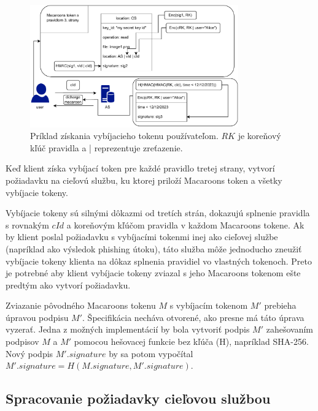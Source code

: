 \begin{figure}
    \centerline{\includegraphics[width=0.8\textwidth]{images/user_request}}
    \caption[Získanie vybíjacieho tokenu používateľom]{Príklad získania vybíjacieho tokenu používateľom. $RK$ je koreňový kľúč pravidla a | reprezentuje zreťazenie.}
    \label{fig:user_request}
\end{figure}

Keď klient získa vybíjací token pre každé pravidlo tretej strany, vytvorí požiadavku na cieľovú službu, ku ktorej priloží Macaroons token a všetky vybíjacie tokeny.

Vybíjacie tokeny sú silnými dôkazmi od tretích strán, dokazujú splnenie pravidla s rovnakým $cId$ a koreňovým kľúčom pravidla v každom Macaroons tokene. Ak by klient poslal požiadavku s vybíjacími tokenmi inej ako cieľovej službe (napríklad ako výsledok phishing útoku), táto služba môže jednoducho zneužiť vybíjacie tokeny klienta na dôkaz splnenia pravidiel vo vlastných tokenoch. Preto je potrebné aby klient vybíjacie tokeny zviazal s jeho Macaroons tokenom ešte predtým ako vytvorí požiadavku.

Zviazanie pôvodného Macaroons tokenu $M$ s vybíjacím tokenom $M'$ prebieha úpravou podpisu $M'$. Špecifikácia necháva otvorené, ako presne má táto úprava vyzerať. Jedna z možných implementácií by bola vytvoriť podpis $M'$ zahešovaním podpisov $M$ a $M'$ pomocou hešovacej funkcie bez kľúča (H), napríklad SHA-256. Nový podpis $M'.signature$ by sa potom vypočítal $M'.signature = H(M.signature, M'.signature)$.


\subsection{Spracovanie požiadavky cieľovou službou}

